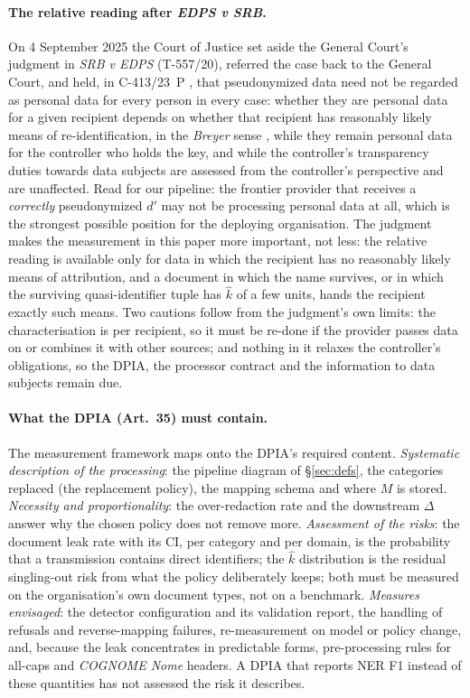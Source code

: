 \documentclass[11pt,a4paper]{article}
\newcommand{\dprime}{d'}
\begin{document}
\paragraph{The relative reading after \emph{EDPS v SRB}.} On 4 September 2025 the Court of Justice set aside the General Court's judgment in \emph{SRB v EDPS} (T-557/20), referred the case back to the General Court, and held, in C-413/23~P \citep{cjeu2025srb}, that pseudonymized data need not be regarded as personal data for every person in every case: whether they are personal data for a given recipient depends on whether that recipient has reasonably likely means of re-identification, in the \emph{Breyer} sense \citep{cjeu2016breyer}, while they remain personal data for the controller who holds the key, and while the controller's transparency duties towards data subjects are assessed from the controller's perspective and are unaffected. Read for our pipeline: the frontier provider that receives a \emph{correctly} pseudonymized $\dprime$ may not be processing personal data at all, which is the strongest possible position for the deploying organisation. The judgment makes the measurement in this paper more important, not less: the relative reading is available only for data in which the recipient has no reasonably likely means of attribution, and a document in which the name survives, or in which the surviving quasi-identifier tuple has $\hat k$ of a few units, hands the recipient exactly such means. Two cautions follow from the judgment's own limits: the characterisation is per recipient, so it must be re-done if the provider passes data on or combines it with other sources; and nothing in it relaxes the controller's obligations, so the DPIA, the processor contract and the information to data subjects remain due.

\paragraph{What the DPIA (Art.~35) must contain.} The measurement framework maps onto the DPIA's required content. \emph{Systematic description of the processing}: the pipeline diagram of \S\ref{sec:defs}, the categories replaced (the replacement policy), the mapping schema and where $M$ is stored. \emph{Necessity and proportionality}: the over-redaction rate and the downstream $\Delta$ answer why the chosen policy does not remove more. \emph{Assessment of the risks}: the document leak rate with its CI, per category and per domain, is the probability that a transmission contains direct identifiers; the $\hat k$ distribution is the residual singling-out risk from what the policy deliberately keeps; both must be measured on the organisation's own document types, not on a benchmark. \emph{Measures envisaged}: the detector configuration and its validation report, the handling of refusals and reverse-mapping failures, re-measurement on model or policy change, and, because the leak concentrates in predictable forms, pre-processing rules for all-caps and \emph{COGNOME Nome} headers. A DPIA that reports NER F1 instead of these quantities has not assessed the risk it describes.
\end{document}

